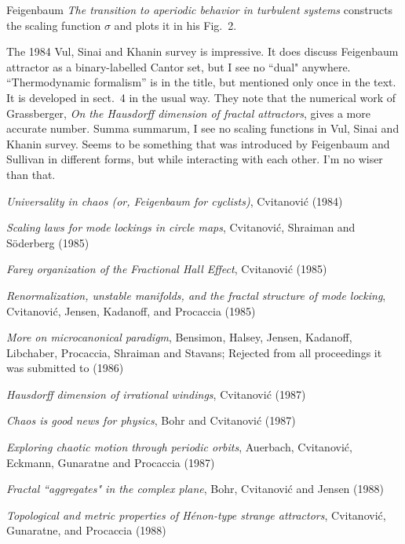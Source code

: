 \begin{description}
Feigenbaum {\em The transition to aperiodic behavior in
turbulent systems} constructs the scaling function $\sigma$ and plots it in
his Fig.~2.

The 1984 Vul, Sinai and Khanin survey is impressive. It does
discuss Feigenbaum attractor as a binary-labelled Cantor set, but I see
no ``dual" anywhere. ``Thermodynamic formalism'' is in the title, but
mentioned only once in the text. It is developed in sect.~4 in the usual
way. They note that the numerical work of Grassberger,
{\em On the {Hausdorff} dimension of fractal attractors}, gives a more
accurate number. Summa summarum, I see no scaling functions in Vul, Sinai
and Khanin survey. Seems to be something that was introduced
by Feigenbaum and Sullivan in different forms, but while interacting with
each other. I'm no wiser than that.

\end{description}

{\em Universality in chaos (or, {Feigenbaum} for cyclists)},
{Cvitanovi{\'c}}
{(1984)}

{\em Scaling laws for mode lockings in circle maps},
{Cvitanovi{\'c}, Shraiman and S\"oderberg}
{(1985)}

{\em Farey organization of the {Fractional Hall Effect}},
{Cvitanovi{\'c}}
{(1985)}

{\em Renormalization, unstable manifolds, and the fractal structure of
mode locking},
{Cvitanovi{\'c},  Jensen, Kadanoff, and Procaccia}
{(1985)}

{\em More on microcanonical paradigm},
{Bensimon, Halsey, Jensen, Kadanoff,
Libchaber, Procaccia,  Shraiman and Stavans};
{Rejected from all proceedings it was submitted to}
{(1986)}

{\em Hausdorff dimension of irrational windings},
{Cvitanovi{\'c}}
{(1987)}

 {\em Chaos is good news for physics},
{Bohr and Cvitanovi{\'c}}
{(1987)}

{\em Exploring chaotic motion through periodic orbits},
{Auerbach, Cvitanovi{\'c}, Eckmann, Gunaratne and Procaccia}
{(1987)}

{\em Fractal ``aggregates" in the complex plane},
{Bohr, Cvitanovi{\'c} and Jensen}
{(1988)}

{\em Topological and metric properties of {H{\'e}non}-type strange attractors},
{Cvitanovi{\'c}, Gunaratne, and Procaccia}
{(1988)}

